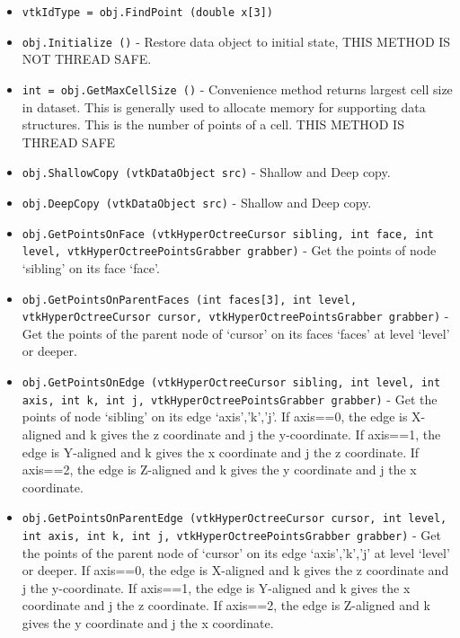 \begin{itemize}
\item  \verb|vtkIdType = obj.FindPoint (double x[3])|

\item  \verb|obj.Initialize ()| -  Restore data object to initial state,
 THIS METHOD IS NOT THREAD SAFE.

\item  \verb|int = obj.GetMaxCellSize ()| -  Convenience method returns largest cell size in dataset. This is generally
 used to allocate memory for supporting data structures.
 This is the number of points of a cell.
 THIS METHOD IS THREAD SAFE

\item  \verb|obj.ShallowCopy (vtkDataObject src)| -  Shallow and Deep copy.

\item  \verb|obj.DeepCopy (vtkDataObject src)| -  Shallow and Deep copy.

\item  \verb|obj.GetPointsOnFace (vtkHyperOctreeCursor sibling, int face, int level, vtkHyperOctreePointsGrabber grabber)| -  Get the points of node `sibling' on its face `face'.
 
 
 
 
 

\item  \verb|obj.GetPointsOnParentFaces (int faces[3], int level, vtkHyperOctreeCursor cursor, vtkHyperOctreePointsGrabber grabber)| -  Get the points of the parent node of `cursor' on its faces `faces' at
 level `level' or deeper.
 
 
 
 

\item  \verb|obj.GetPointsOnEdge (vtkHyperOctreeCursor sibling, int level, int axis, int k, int j, vtkHyperOctreePointsGrabber grabber)| -  Get the points of node `sibling' on its edge `axis','k','j'.
 If axis==0, the edge is X-aligned and k gives the z coordinate and j the
 y-coordinate. If axis==1, the edge is Y-aligned and k gives the x coordinate
 and j the z coordinate. If axis==2, the edge is Z-aligned and k gives the
 y coordinate and j the x coordinate.
 
 
 
 
 
 
 

\item  \verb|obj.GetPointsOnParentEdge (vtkHyperOctreeCursor cursor, int level, int axis, int k, int j, vtkHyperOctreePointsGrabber grabber)| -  Get the points of the parent node of `cursor' on its edge `axis','k','j'
 at level `level' or deeper.
 If axis==0, the edge is X-aligned and k gives the z coordinate and j the
 y-coordinate. If axis==1, the edge is Y-aligned and k gives the x
 coordinate and j the z coordinate. If axis==2, the edge is Z-aligned and
 k gives the y coordinate and j the x coordinate.
 

\end{itemize}
